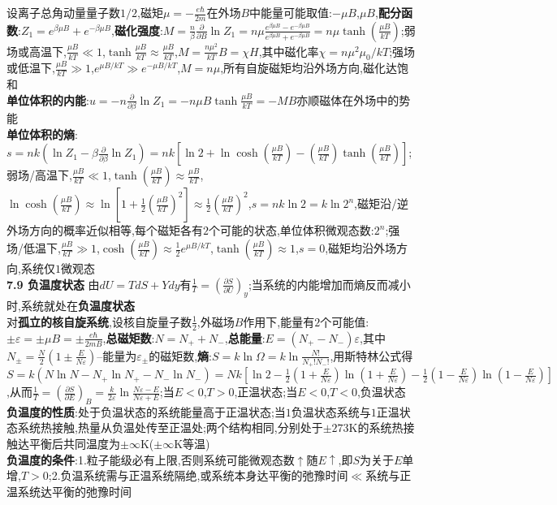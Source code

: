 \documentclass[10pt,a4paper]{article}
\begin{document}
\begin{multicols}{2}
设离子总角动量量子数$1/2$,磁矩$\mu=-\frac{e\hbar}{2m}$在外场$B$中能量可能取值:$-\mu B$,$\mu B$,\textbf{配分函数}:$Z_1=e^{\beta\mu B}+e^{-\beta\mu B}$,\textbf{磁化强度}:$M=\frac{n}{\beta}\frac{\partial}{\partial B}\ln Z_1=n\mu\frac{e^{\beta\mu B}-e^{-\beta\mu B}}{e^{\beta\mu B}+e^{-\beta\mu B}}=n\mu\tanh\left(\frac{\mu B}{kT}\right)$;弱场或高温下,$\frac{\mu B}{kT}\ll1$,$\tanh\frac{\mu B}{kT}\approx\frac{\mu B}{kT}$,$M=\frac{n\mu^2}{kT}B=\chi H$,其中磁化率$\chi=n\mu^2\mu_0/kT$;强场或低温下,$\frac{\mu B}{kT}\gg1$,$e^{\mu B/kT}\gg e^{-\mu B/kT}$,$M=n\mu$,所有自旋磁矩均沿外场方向,磁化达饱和\\
\textbf{单位体积的内能}:$u=-n\frac{\partial}{\partial\beta}\ln Z_1=-n\mu B\tanh\frac{\mu B}{kT}=-MB$亦顺磁体在外场中的势能\\
\textbf{单位体积的熵}:$s=nk\left(\ln Z_1-\beta\frac{\partial}{\partial\beta}\ln Z_1\right)=nk\left[\ln2+\ln\cosh\left(\frac{\mu B}{kT}\right)-\left(\frac{\mu B}{kT}\right)\tanh\left(\frac{\mu B}{kT}\right)\right]$;弱场/高温下,$\frac{\mu B}{kT}\ll1$,$\tanh\left(\frac{\mu B}{kT}\right)\approx\frac{\mu B}{kT}$,$\ln\cosh\left(\frac{\mu B}{kT}\right)\approx\ln\left[1+\frac{1}{2}\left(\frac{\mu B}{kT}\right)^2\right]\approx\frac{1}{2}\left(\frac{\mu B}{kT}\right)^2$,$s=nk\ln2=k\ln2^n$,磁矩沿/逆外场方向的概率近似相等,每个磁矩各有$2$个可能的状态,单位体积微观态数:$2^n$;强场/低温下,$\frac{\mu B}{kT}\gg1$,$\cosh\left(\frac{\mu B}{kT}\right)\approx\frac{1}{2}e^{\mu B/kT}$,$\tanh\left(\frac{\mu B}{kT}\right)\approx1$,$s=0$,磁矩均沿外场方向,系统仅$1$微观态\\
\textbf{7.9 负温度状态}
由$dU=TdS+Ydy$有$\frac{1}{T}=\left(\frac{\partial S}{\partial U}\right)_y$;当系统的内能增加而熵反而减小时,系统就处在\textbf{负温度状态}\\
对\textbf{孤立的核自旋系统},设核自旋量子数$\frac{1}{2}$,外磁场$B$作用下,能量有$2$个可能值:$\pm\varepsilon=\pm\mu B=\pm\frac{e\hbar}{2mB}$,\textbf{总磁矩数}:$N=N_++N_-$,\textbf{总能量}:$E=(N_+-N_-)\varepsilon$,其中$N_{\pm}=\frac{N}{2}(1\pm\frac{E}{N\varepsilon})$--能量为$\varepsilon_{\pm}$的磁矩数,\textbf{熵}:$S=k\ln\Omega=k\ln\frac{N!}{N_+!N_-!}$,用斯特林公式得$S=k(N\ln N-N_+\ln N_+-N_-\ln N_-)=Nk\left[\ln2-\frac{1}{2}\left(1+\frac{E}{N\varepsilon}\right)\ln\left(1+\frac{E}{N\varepsilon}\right)-\frac{1}{2}\left(1-\frac{E}{N\varepsilon}\right)\ln\left(1-\frac{E}{N\varepsilon}\right)\right]$,从而$\frac{1}{T}=\left(\frac{\partial S}{\partial E}\right)_B=\frac{k}{2\varepsilon}\ln\frac{N\varepsilon-E}{N\varepsilon+E}$;当$E<0$,$T>0$,正温状态;当$E<0$,$T<0$,负温状态\\
\textbf{负温度的性质}:处于负温状态的系统能量高于正温状态;当$1$负温状态系统与$1$正温状态系统热接触,热量从负温处传至正温处;两个结构相同,分别处于$\pm273$K的系统热接触达平衡后共同温度为$\pm\infty$K($\pm\infty$K等温)\\
\textbf{负温度的条件}:1.粒子能级必有上限,否则系统可能微观态数$\uparrow$随$E\uparrow$,即$S$为关于$E$单增,$T>0$;2.负温系统需与正温系统隔绝,或系统本身达平衡的弛豫时间$\ll$系统与正温系统达平衡的弛豫时间
\end{multicols}
\end{document}
